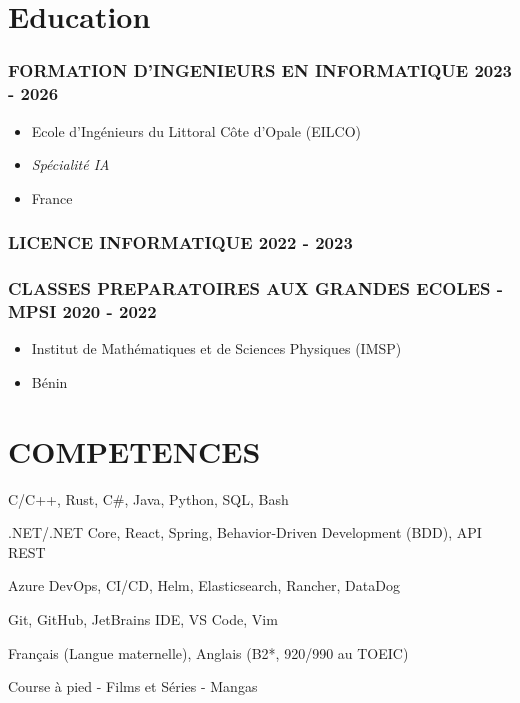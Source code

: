 \documentclass[11pt]{article} %
\begin{document}
\section{Education}

\subsubsection{FORMATION D’INGENIEURS EN INFORMATIQUE \hfill 2023 - 2026}
\begin{itemize}
	\item Ecole d’Ingénieurs du Littoral Côte d’Opale (EILCO)
	\item \textit{Spécialité IA}
	\item France
\end{itemize}

\subsubsection{LICENCE INFORMATIQUE \hfill 2022 - 2023}

\subsubsection{CLASSES PREPARATOIRES AUX GRANDES ECOLES - MPSI \hfill 2020 - 2022}
\begin{itemize}
	\item Institut de Mathématiques et de Sciences Physiques (IMSP)
	\item Bénin
\end{itemize}


\section{COMPETENCES}
\begin{description}[itemsep=0pt]
	\item[Langages :] C/C++, Rust, C\#, Java, Python, SQL, Bash
	\item[Frontend - Backend :] .NET/.NET Core, React, Spring, Behavior-Driven Development (BDD), API REST
	\item[DevOps :] Azure DevOps, CI/CD, Helm, Elasticsearch, Rancher, DataDog
	\item[Outils :] Git, GitHub, JetBrains IDE, VS Code, Vim
	\item[Langues :] Français (Langue maternelle), Anglais (B2*, 920/990 au TOEIC)
	\item[Loisirs :] Course à pied - Films et Séries - Mangas
\end{description}
\end{document}
